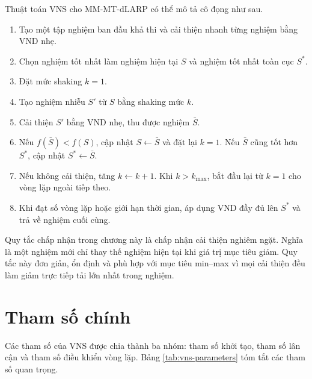 Thuật toán VNS cho MM-MT-dLARP có thể mô tả cô đọng như sau.

\begin{enumerate}[label=\textbf{Bước \arabic*.}, leftmargin=1.6cm]
    \item Tạo một tập nghiệm ban đầu khả thi và cải thiện nhanh từng nghiệm bằng VND nhẹ.
    \item Chọn nghiệm tốt nhất làm nghiệm hiện tại \(S\) và nghiệm tốt nhất toàn cục \(S^*\).
    \item Đặt mức shaking \(k=1\).
    \item Tạo nghiệm nhiễu \(S'\) từ \(S\) bằng shaking mức \(k\).
    \item Cải thiện \(S'\) bằng VND nhẹ, thu được nghiệm \(\bar{S}\).
    \item Nếu \(f(\bar{S}) < f(S)\), cập nhật \(S \leftarrow \bar{S}\) và đặt lại \(k=1\). Nếu \(\bar{S}\) cũng tốt hơn \(S^*\), cập nhật \(S^* \leftarrow \bar{S}\).
    \item Nếu không cải thiện, tăng \(k \leftarrow k+1\). Khi \(k > k_{\max}\), bắt đầu lại từ \(k=1\) cho vòng lặp ngoài tiếp theo.
    \item Khi đạt số vòng lặp hoặc giới hạn thời gian, áp dụng VND đầy đủ lên \(S^*\) và trả về nghiệm cuối cùng.
\end{enumerate}

Quy tắc chấp nhận trong chương này là chấp nhận cải thiện nghiêm ngặt. Nghĩa là một nghiệm mới chỉ thay thế nghiệm hiện tại khi giá trị mục tiêu giảm. Quy tắc này đơn giản, ổn định và phù hợp với mục tiêu min--max vì mọi cải thiện đều làm giảm trực tiếp tải lớn nhất trong nghiệm.

\section{Tham số chính}
\label{sec:vns-parameters}

Các tham số của VNS được chia thành ba nhóm: tham số khởi tạo, tham số lân cận và tham số điều khiển vòng lặp. Bảng \ref{tab:vns-parameters} tóm tắt các tham số quan trọng.


